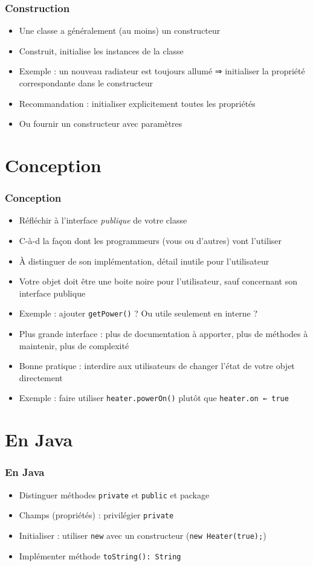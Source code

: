 \documentclass[english, french]{beamer}
\begin{document}
\begin{frame}
	\frametitle{Construction}
	\begin{itemize}
		\item Une classe a {\tiny généralement} (au moins) un constructeur
		\item Construit, initialise les instances de la classe
		\item Exemple : un nouveau radiateur est toujours allumé ⇒ initialiser la propriété correspondante dans le constructeur
		\item Recommandation : initialiser explicitement toutes les propriétés
		\item Ou fournir un constructeur avec paramètres
	\end{itemize}
\end{frame}

\section{Conception}
\begin{frame}
	\frametitle{Conception}
	\begin{itemize}
		\item Réfléchir à l’interface \emph{publique} de votre classe
		\item C-à-d la façon dont les programmeurs (vous ou d’autres) vont l’utiliser
		\item À distinguer de son implémentation, détail inutile pour l’utilisateur
		\item Votre objet doit être une boite noire pour l’utilisateur, sauf concernant son interface publique
		\item Exemple : ajouter \texttt{getPower()} ? Ou utile seulement en interne ?
		\item Plus grande interface : plus de documentation à apporter, plus de méthodes à maintenir, plus de complexité
		\item Bonne pratique : interdire aux utilisateurs de changer l’état de votre objet directement
		\item Exemple : faire utiliser \texttt{heater.powerOn()} plutôt que \texttt{heater.on ← true}
	\end{itemize}
\end{frame}

\section{En Java}
\begin{frame}
	\frametitle{En Java}
	\begin{itemize}
		\item Distinguer méthodes \texttt{private} et \texttt{public} {\tiny et package}
		\item Champs (propriétés) : privilégier \texttt{private}
		\item Initialiser : utiliser \texttt{new} avec un constructeur (\texttt{new Heater(true);})
		\item Implémenter méthode \texttt{toString(): String}
	\end{itemize}
\end{frame}
\end{document}
